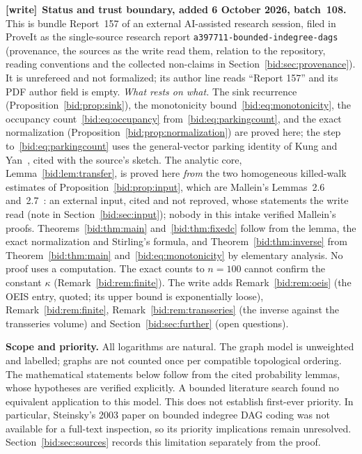 \documentclass[11pt,letterpaper]{article}
\numberwithin{equation}{section}
\theoremstyle{remark}\newtheorem{remark}[theorem]{Remark}
\newcommand{\file}[1]{\nolinkurl{#1}}
\newenvironment{writenote}[1][]{\par\smallskip\begingroup\small
 \noindent\textbf{[write]}\if\relax\detokenize{#1}\relax\else~\textbf{#1.}\fi\ }%
 {\par\endgroup\smallskip}
\begin{document}
\begin{writenote}[Status and trust boundary, added 6 October 2026, batch~108]
This is bundle Report~157 of an external AI-assisted research session, filed
in ProveIt as the single-source research report
\file{a397711-bounded-indegree-dags} (provenance, the sources as the write
read them, relation to the repository, reading conventions and the collected
non-claims in Section~\ref{bid:sec:provenance}). It is unrefereed and not
formalized; its author line reads ``Report 157'' and its PDF author field is
empty. \emph{What rests on what.} The sink recurrence
(Proposition~\ref{bid:prop:sink}), the monotonicity
bound~\eqref{bid:eq:monotonicity}, the occupancy count~\eqref{bid:eq:occupancy}
from~\eqref{bid:eq:parkingcount}, and the exact normalization
(Proposition~\ref{bid:prop:normalization}) are proved here; the step
to~\eqref{bid:eq:parkingcount} uses the general-vector parking identity of
Kung and Yan~\cite{kungyan}, cited with the source's sketch. The analytic
core, Lemma~\ref{bid:lem:transfer}, is proved here \emph{from} the two
homogeneous killed-walk estimates of Proposition~\ref{bid:prop:input}, which
are Mallein's Lemmas~2.6 and~2.7~\cite{mallein}: an external input, cited and
not reproved, whose statements the write read (note in
Section~\ref{bid:sec:input}); nobody in this intake verified Mallein's
proofs. Theorems~\ref{bid:thm:main} and~\ref{bid:thm:fixedc} follow from the
lemma, the exact normalization and Stirling's formula, and
Theorem~\ref{bid:thm:inverse} from Theorem~\ref{bid:thm:main}
and~\eqref{bid:eq:monotonicity} by elementary analysis. No proof uses a
computation. The exact counts to $n=100$ cannot confirm the constant $\kappa$
(Remark~\ref{bid:rem:finite}). The write adds Remark~\ref{bid:rem:oeis} (the
OEIS entry, quoted; its upper bound is exponentially loose),
Remark~\ref{bid:rem:finite}, Remark~\ref{bid:rem:transseries} (the inverse
against the transseries volume) and Section~\ref{bid:sec:further} (open
questions).
\end{writenote}
\newpage
\tableofcontents
\medskip
\noindent\textbf{Scope and priority.}
All logarithms are natural. The graph model is unweighted and labelled;
graphs are not counted once per compatible topological ordering. The
mathematical statements below follow from the cited probability lemmas,
whose hypotheses are verified explicitly. A bounded literature search
found no equivalent application to this model. This does not establish
first-ever priority. In particular, Steinsky's 2003 paper on bounded
indegree DAG coding was not available for a full-text inspection, so its
priority implications remain unresolved. Section~\ref{bid:sec:sources}
records this limitation separately from the proof.
\newpage
\end{document}
